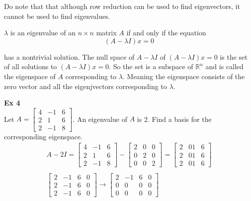 \documentclass{article}
\begin{document}
  Do note that that although row reduction can be used to find eigenvectors, it cannot be used to find eigenvalues.

 $ \lambda $ is an eigenvalue of an $ n \times n $ matrix $ A $ if and only if the equation
 \[
   (A-\lambda I)x=0
 \]

 has a nontrivial solution. The null space of $ A-\lambda I $  of $ (A-\lambda I)x=0$ is the set of all solutions to $ (A-\lambda I)x=0 $. So the set is a subspace of $ \mathbb{R}^{n} $ and is called the eigenspace of $ A $ corresponding to $ \lambda $. Meaning the eigenspace consists of the zero vector and all the eigenjvectors corresponding to $ \lambda $.

 \textbf{Ex 4}\\
 Let $ A=\begin{bmatrix}
     4 &-1 &6\\
     2 &1 &6\\
     2 &-1 &8
 \end{bmatrix} $. An eigenvalue of $ A $ is 2. Find a basis for the corresponding eigenspace.
 \[
     \begin{gathered}
     A-2I = \begin{bmatrix}
         4 &-1 &6\\
         2 &1 &6\\
         2 &-1 &8
     \end{bmatrix}-
     \begin{bmatrix}
         2 &0 &0\\
         0 &2 &0\\
         0 &0 &2
     \end{bmatrix}=
     \begin{bmatrix}
        2 &01 &6\\
        2 &01 &6\\
        2 &01 &6
     \end{bmatrix}\\
     ~\\
     \begin{bmatrix}
         2 &-1 &6 &0\\
         2 &-1 &6 &0\\
         2 &-1 &6 &0
     \end{bmatrix} \to
     \begin{bmatrix}
         2 &-1 &6 &0\\
         0 &0 &0 &0\\
         0 &0 &0 &0
     \end{bmatrix}
     \end{gathered}
 \]
\end{document}
